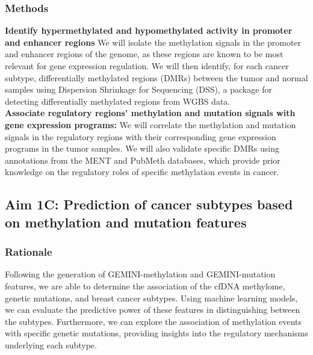 \documentclass[11pt]{article}
\begin{document}
\subsubsection*{Methods}
\textbf{Identify hypermethylated and hypomethylated activity in promoter and enhancer regions} We will isolate the methylation signals in the promoter and enhancer regions of the genome, as these regions are known to be most relevant for gene expression regulation. 
We will then identify, for each cancer subtype, differentially methylated regions (DMRs) between the tumor and normal samples using Dispersion Shrinkage for Sequencing (DSS), a package for detecting differentially methylated regions from WGBS data. 
\medskip \\
\textbf{Associate regulatory regions' methylation and mutation signals with gene expression programs:} We will correlate the methylation and mutation signals in the regulatory regions with their corresponding gene expression programs in the tumor samples. We will also validate specific DMRs using annotations from the MENT and PubMeth databases, which provide prior knowledge on the regulatory roles of specific methylation events in cancer.

\subsection*{Aim 1C: Prediction of cancer subtypes based on methylation and mutation features}
\subsubsection*{Rationale}
Following the generation of GEMINI-methylation and GEMINI-mutation features,
we are able to determine the association of the cfDNA methylome, genetic mutations,
and breast cancer subtypes. Using machine learning models, we can evaluate the 
predictive power of these features in distinguishing between the subtypes.
Furthermore, we can explore the association of methylation events with specific
genetic mutations, providing insights into the regulatory mechanisms underlying
each subtype.
\end{document}
